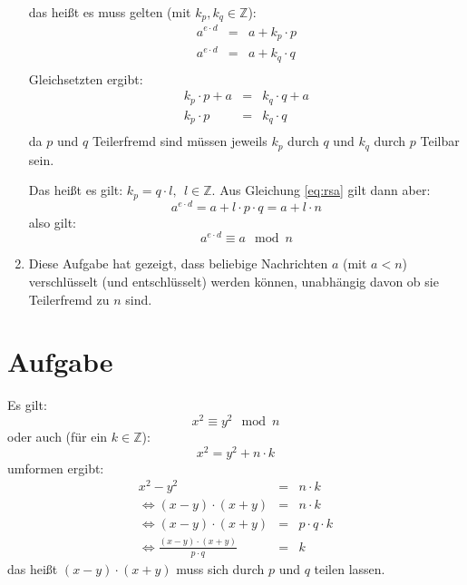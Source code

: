 \documentclass[DIN, pagenumber=false, fontsize=11pt, parskip=half]{scrartcl}
\begin{document}
\begin{enumerate}[label=(\roman*)]
            das heißt es muss gelten (mit $k_p, k_q \in \mathbb{Z}$):
            \begin{eqnarray}
                a^{e \cdot d} &=& a + k_p \cdot p \label{eq:rsa} \\
                a^{e \cdot d} &=& a + k_q \cdot q \\
            \end{eqnarray}
            Gleichsetzten ergibt:
            \begin{eqnarray}
                k_p \cdot p + a &=& k_q \cdot q + a\\
                k_p \cdot p &=& k_q \cdot q\\
            \end{eqnarray}
            da $p$ und $q$ Teilerfremd sind müssen jeweils $k_p$ durch $q$ und $k_q$ durch
            $p$ Teilbar sein.

            Das heißt es gilt: $k_p = q \cdot l,\ \ l \in \mathbb{Z}$.
            Aus Gleichung \ref{eq:rsa} gilt dann aber:
            \begin{equation}
                a^{e \cdot d} = a + l \cdot p \cdot q = a + l \cdot n
            \end{equation}
            also gilt:
            \begin{equation}
                a^{e \cdot d} \equiv a \mod n
            \end{equation}
        \item Diese Aufgabe hat gezeigt, dass beliebige Nachrichten $a$ 
            (mit $a<n$) verschlüsselt (und entschlüsselt) werden können, 
            unabhängig davon ob sie Teilerfremd zu $n$ sind.
    \end{enumerate}

    \section{Aufgabe}
    Es gilt:
    \begin{equation}
        x^2 \equiv y^2 \mod n 
    \end{equation}
    oder auch (für ein $k \in \mathbb{Z}$):
    \begin{equation}
        x^2 = y^2 + n \cdot k
    \end{equation}
    umformen ergibt:
    \begin{eqnarray}
        x^2 - y^2 &=& n \cdot k \\
        \Leftrightarrow (x-y) \cdot (x+y) &=& n \cdot k \\
        \Leftrightarrow (x-y) \cdot (x+y) &=& p \cdot q \cdot k \\
        \Leftrightarrow \frac{(x-y) \cdot (x+y)}{p \cdot q} &=& k
    \end{eqnarray}
    das heißt $(x-y) \cdot (x+y)$ muss sich durch $p$ und $q$ teilen lassen.
\end{document}

